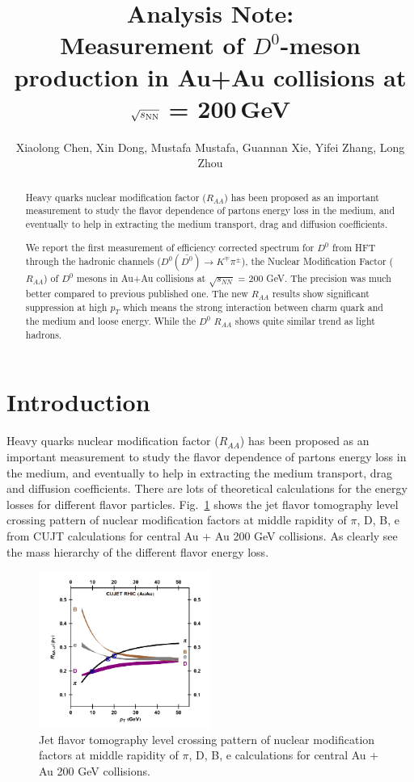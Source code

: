 \documentclass[a4paper]{article}
\title{Analysis Note: \\
Measurement of $D^0$-meson production in Au+Au collisions at $\sqrt{s_{\rm NN}}$ = 200\,GeV}
\author{Xiaolong Chen, Xin Dong, Mustafa Mustafa, Guannan Xie, Yifei Zhang, Long Zhou}
\begin{document}
\maketitle

\begin{abstract}

Heavy quarks nuclear modification factor ($R_{AA}$) has been proposed as an important measurement to study the flavor dependence of partons energy loss in the medium, and eventually to help in extracting the medium transport, drag and diffusion coefficients.

We report the first measurement of efficiency corrected spectrum for $D^0$ from HFT through the hadronic channels ($D^0(\bar{D^0}) \rightarrow K^{\mp}\pi^{\pm}$), the Nuclear Modification Factor ($R_{AA}$) of $D^0$ mesons in Au+Au collisions at $\sqrt{s_{NN}}$ = 200 GeV. The precision was much better compared to previous published one. The new $R_{AA}$ results show significant suppression at high $p_T$ which means the strong interaction between charm quark and the medium and loose energy. While the $D^0$ $R_{AA}$ shows quite similar trend as light hadrons.

\end{abstract}

\section{Introduction}

Heavy quarks nuclear modification factor ($R_{AA}$) has been proposed as an important measurement to study the flavor dependence of partons energy loss in the medium, and eventually to help in extracting the medium transport, drag and diffusion coefficients. There are lots of theoretical calculations for the energy losses for different flavor particles. Fig.~\ref{fig:raa_CUJE} shows the jet flavor tomography level crossing pattern of nuclear modification factors at middle rapidity of $\pi$, D, B, e from CUJT calculations for central Au + Au 200 GeV collisions. As clearly see the mass hierarchy of the different flavor energy loss.

\begin{figure}
\centering
\includegraphics[width=0.5\textwidth]{fig/raa_CUJE.png}
\caption{Jet flavor tomography level crossing pattern of nuclear modification factors at middle rapidity of $\pi$, D, B, e calculations for central Au + Au 200 GeV collisions.}
\label{fig:raa_CUJE} 
\end{figure}
\end{document}
